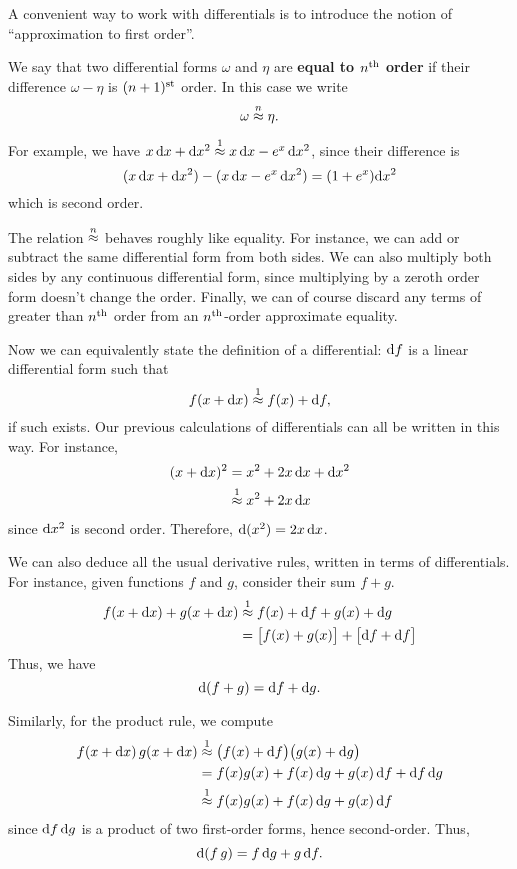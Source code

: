 \documentclass[12pt]{amsart}
\begin{document}
A convenient way to work with differentials is to introduce the notion of ``approximation to first order''.

\begin{defn}
  We say that two differential forms $\omega$ and $\eta$ are \textbf{equal to $n^{\mathrm{th}}$ order} if their difference $\omega-\eta$ is $(n+1)^{\mathrm{st}}$ order.
  In this case we write
  \[\omega\mathrel{\overset{n}{\approx}} \eta.\]
\end{defn}

For example, we have $x\,\mathrm{d} x + \mathrm{d} x^2 \mathrel{\overset{1}{\approx}} x\,\mathrm{d} x - e^x \,\mathrm{d} x^2$, since their difference is
\[ (x\,\mathrm{d} x + \mathrm{d} x^2) - (x\,\mathrm{d} x - e^x\, \mathrm{d} x^2) = (1+e^x)\mathrm{d} x^2 \]
which is second order.

The relation $\mathrel{\overset{n}{\approx}}$ behaves roughly like equality.
For instance, we can add or subtract the same differential form from both sides.
We can also multiply both sides by any continuous differential form, since multiplying by a zeroth order form doesn't change the order.
Finally, we can of course discard any terms of greater than $n^{\mathrm{th}}$ order from an $n^{\mathrm{th}}$-order approximate equality.

Now we can equivalently state the definition of a differential: $\mathrm{d} f$ is a linear differential form such that
\[ f(x+\mathrm{d} x) \mathrel{\overset{1}{\approx}} f(x) + \mathrm{d} f, \]
if such exists.
Our previous calculations of differentials can all be written in this way.
For instance,
\begin{align*}
  (x+\mathrm{d} x)^2 &= x^2 + 2 x\,\mathrm{d} x + \mathrm{d} x^2\\
  &\mathrel{\overset{1}{\approx}} x^2 + 2 x\,\mathrm{d} x
\end{align*}
since $\mathrm{d} x^2$ is second order.
Therefore, $\mathrm{d}(x^2) = 2x\,\mathrm{d} x$.

We can also deduce all the usual derivative rules, written in terms of differentials.
For instance, given functions $f$ and $g$, consider their sum $f+g$.
\begin{align*}
  f(x+\mathrm{d} x) + g(x+\mathrm{d} x)
  &\mathrel{\overset{1}{\approx}} f(x) + \mathrm{d} f + g(x) + \mathrm{d} g\\
  &= \big[f(x) + g(x)\big] + \big[ \mathrm{d} f + \mathrm{d} f \big]
\end{align*}
Thus, we have
\[ \mathrm{d}(f+g) = \mathrm{d} f + \mathrm{d} g. \]

Similarly, for the product rule, we compute
\begin{align*}
  f(x+\mathrm{d} x) \, g(x+\mathrm{d} x)
  &\mathrel{\overset{1}{\approx}} \big(f(x)+\mathrm{d} f\big)\big(g(x) + \mathrm{d} g \big)\\
  &= f(x) g(x) + f(x) \,\mathrm{d} g + g(x) \,\mathrm{d} f + \mathrm{d} f\,\mathrm{d} g\\
  &\mathrel{\overset{1}{\approx}} f(x) g(x) + f(x) \,\mathrm{d} g + g(x) \,\mathrm{d} f
\end{align*}
since $\mathrm{d} f\,\mathrm{d} g$ is a product of two first-order forms, hence second-order.
Thus,
\[ \mathrm{d}(f\,g) = f\,\mathrm{d} g + g\,\mathrm{d} f.\]
\end{document}
